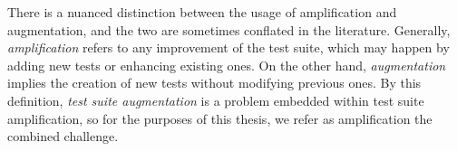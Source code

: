 There is a nuanced distinction between the usage of amplification and augmentation, and the two are sometimes conflated in the literature.
Generally, \textit{amplification} refers to any improvement of the test suite, which may happen by adding new tests or enhancing existing ones.
On the other hand, \textit{augmentation} implies the creation of new tests without modifying previous ones.
By this definition, \textit{test suite augmentation} is a problem embedded within test suite amplification, so for the purposes of this thesis, we refer as amplification the combined challenge.
